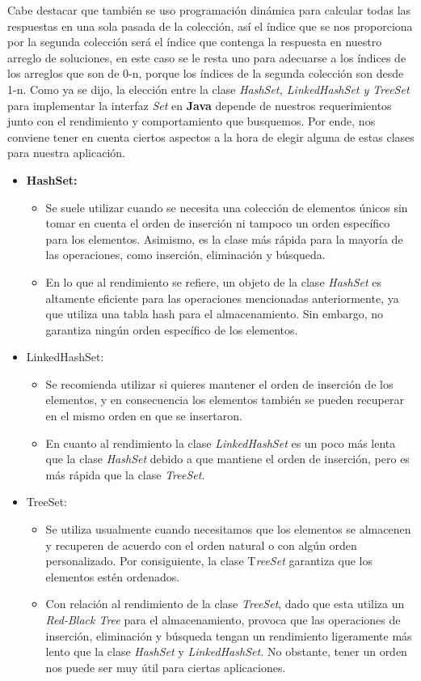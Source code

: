 \documentclass{report}
\begin{document}
Cabe destacar que también se uso programación dinámica para calcular todas las respuestas en una sola pasada de la colección, así el índice que se nos proporciona por la segunda colección será el índice que contenga la respuesta en nuestro arreglo de soluciones, en este caso se le resta uno para adecuarse a los índices de los arreglos que son de 0-n, porque los índices de la segunda colección son desde 1-n.
Como ya se dijo, la elección entre la clase \textit{HashSet, LinkedHashSet y TreeSet} para implementar la interfaz \textit{Set} en \textbf{Java} depende de nuestros requerimientos junto con el rendimiento y comportamiento que busquemos. Por ende, nos conviene tener en cuenta ciertos aspectos a la hora de elegir alguna de estas clases para nuestra aplicación.

\begin{itemize}
    \item \textbf{HashSet:}
    \begin{itemize}
    \item Se suele utilizar cuando se necesita una colección de elementos únicos sin tomar en cuenta el orden de inserción ni tampoco un orden específico para los elementos. Asimismo, es la clase más rápida para la mayoría de las operaciones, como inserción, eliminación y búsqueda.
    \item En lo que al rendimiento se refiere, un objeto de la clase \textit{HashSet} es altamente eficiente para las operaciones mencionadas anteriormente, ya que utiliza una tabla hash para el almacenamiento. Sin embargo, no garantiza ningún orden específico de los elementos.
    \end{itemize}
    \item LinkedHashSet:
    \begin{itemize}
    \item Se recomienda utilizar si quieres mantener el orden de inserción de los elementos, y en consecuencia los elementos también se pueden recuperar en el mismo orden en que se insertaron.
    \item En cuanto al rendimiento la clase\textit{ LinkedHashSet} es un poco más lenta que la clase\textit{ HashSet} debido a que mantiene el orden de inserción, pero es más rápida que la clase \textit{TreeSet}.
    \end{itemize}
    \item TreeSet:
    \begin{itemize}
    \item Se utiliza usualmente cuando necesitamos que los elementos se almacenen y recuperen de acuerdo con el orden natural o con algún orden personalizado. Por consiguiente, la clase T\textit{reeSet} garantiza que los elementos estén ordenados.
    \item Con relación al rendimiento de la clase \textit{TreeSet}, dado que esta utiliza un \textit{Red-Black Tree} para el almacenamiento, provoca que las operaciones de inserción, eliminación y búsqueda tengan un rendimiento ligeramente más lento que la clase \textit{HashSet} y \textit{LinkedHashSet.} No obstante, tener un orden nos puede ser muy útil para ciertas aplicaciones.
    \end{itemize}
\end{itemize}
\end{document}
